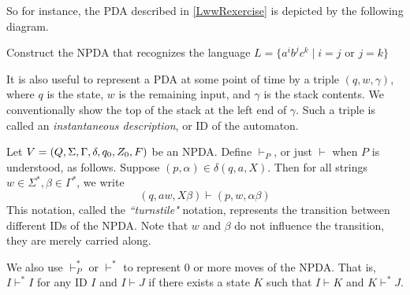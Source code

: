 \vspace{3mm}
So for instance, the PDA described in \ref{LwwRexercise} is depicted by the following diagram.

\begin{center}
\end{center}

\begin{exercise}
Construct the NPDA that recognizes the language $L=\{a^ib^jc^k\mid i=j\text{ or }j=k\}$
\end{exercise}

It is also useful to represent a PDA at some point of time by a triple $(q,w,\gamma)$, where $q$ is the state, $w$ is the remaining input, and $\gamma$ is the stack contents. We conventionally show the top of the stack at the left end of $\gamma$. Such a triple is called an \textit{instantaneous description}, or ID of the automaton.

\vspace{3mm}
Let $V=(Q,\Sigma,\Gamma,\delta,q_0,Z_0,F)$ be an NPDA. Define $\vdash_P$, or just $\vdash$ when $P$ is understood, as follows. Suppose $(p,\alpha)\in\delta(q,a,X)$. Then for all strings $w\in\Sigma^*,\beta\in\Gamma^*$, we write
$$(q,aw,X\beta)\vdash(p,w,\alpha\beta)$$
This notation, called the \textit{``turnstile"} notation, represents the transition between different IDs of the NPDA. Note that $w$ and $\beta$ do not influence the transition, they are merely carried along.

We also use $\vdash^*_P$ or $\vdash^*$ to represent $0$ or more moves of the NPDA. That is, $I\vdash^* I$ for any ID $I$ and $I\vdash J$ if there exists a state $K$ such that $I\vdash K$ and $K\vdash^* J$.

